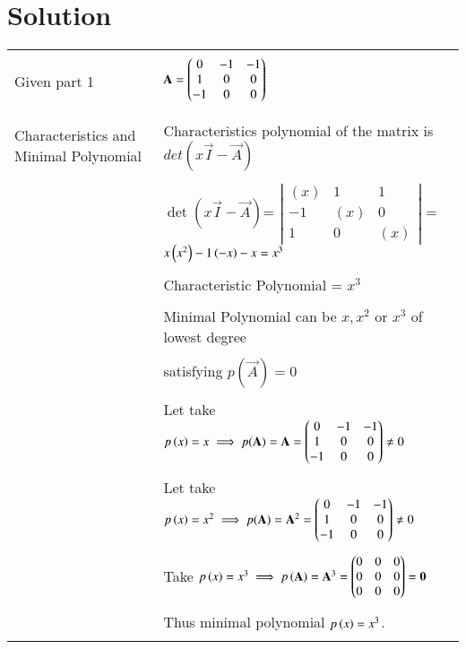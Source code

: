 \documentclass[journal,12pt]{IEEEtran}
\begin{document}
\section{\textbf{Solution}}
\renewcommand{\thetable}{2}
\begin{longtable}{|l|l|}
\hline
\multirow{3}{*}{Given part 1} & \\
&$\mathbf{A}=\begin{pmatrix}0&-1&-1\\1&0&0\\-1&0&0\end{pmatrix}$\\
&\\
\hline


\multirow{3}{*}{Characteristics and Minimal Polynomial} & \\
&
Characteristics polynomial of the matrix  is $det(x\vec{I}-\vec{A})$\\ 
&\\
& $\det(x\vec{I}-\vec{A})$= $\left|
                \begin{array}{ccc}
                (x) & 1 & 1\\
                -1 & (x) & 0\\
                1 & 0 & (x)
                \end{array} \right|$ =$x\left(x^2\right)-1\left(-x\right)-x=x^3$\\
&\\
& Characteristic Polynomial = $x^3$\\
&\\
& Minimal Polynomial can be $x,x^2$ or $x^3$ of lowest degree\\
&\\
&satisfying $p(\vec{A})=0$    \\
&\\
&Let take $p\left(x\right)=x\implies p(\mathbf{A})=\mathbf{A}=\begin{pmatrix}0&-1&-1\\1&0&0\\-1&0&0\end{pmatrix}\neq0$\\
&\\
&Let take $p\left(x\right)=x^2\implies p(\mathbf{A})=\mathbf{A}^2=\begin{pmatrix}0&-1&-1\\1&0&0\\-1&0&0\end{pmatrix}\neq0$\\
&\\
&Take $p\left(x\right)=x^3\implies p\left(\mathbf{A}\right) =\mathbf{A}^3=\begin{pmatrix}0&0&0\\0&0&0\\0&0&0\end{pmatrix}=\mathbf{0}$\\
&\\
&Thus minimal polynomial $p\left(x\right)=x^3$.\\  
&\\

\end{longtable}
\end{document}
